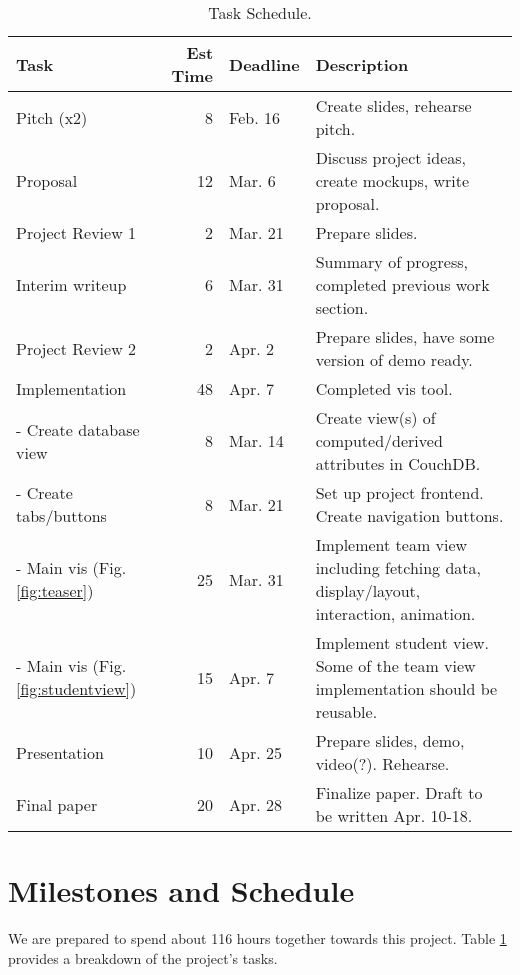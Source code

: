 \documentclass[preprint,journal]{vgtc}       %
\begin{document}
\begin{table}[!htbp]
  \caption{Task Schedule.}
  \label{tab:schedule}
  \centering
  \begin{tabular*}{\textwidth}{lrll}%
    \hline
    \textbf{Task} & \textbf{Est Time} & \textbf{Deadline} & \textbf{Description} \\
    \hline
    Pitch (x2)                       &  8 & Feb. 16  & Create slides, rehearse pitch. \\
    Proposal                         & 12 & Mar. 6   & Discuss project ideas, create mockups, write proposal. \\
    Project Review 1                 &  2 & Mar. 21  & Prepare slides. \\
    Interim writeup                  &  6 & Mar. 31  & Summary of progress, completed previous work section. \\
    Project Review 2                 &  2 & Apr. 2   & Prepare slides, have some version of demo ready. \\
    Implementation                   & 48 & Apr. 7   & Completed vis tool. \\
     - Create database view          &  8 & Mar. 14  & Create view(s) of computed/derived attributes in CouchDB. \\
     - Create tabs/buttons           &  8 & Mar. 21  & Set up project frontend. Create navigation buttons. \\
     - Main vis (Fig. \ref{fig:teaser})          & 25 & Mar. 31  & Implement team view including fetching data, display/layout,  interaction, animation. \\
     - Main vis (Fig. \ref{fig:studentview})       & 15 & Apr. 7   & Implement student view. Some of the team view implementation should be reusable. \\
    Presentation                     & 10 & Apr. 25  & Prepare slides, demo, video(?). Rehearse. \\
    Final paper                      & 20 & Apr. 28  & Finalize paper. Draft to be written Apr. 10-18. \\
    \hline
  \end{tabular*}
\end{table}

\section{Milestones and Schedule}
We are prepared to spend about 116 hours together towards this project. Table \ref{tab:schedule} provides
a breakdown of the project's tasks.
\end{document}
